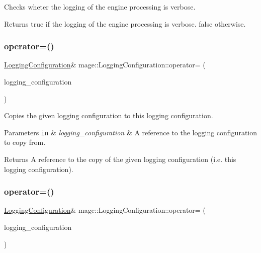 Checks wheter the logging of the engine processing is verbose.

\begin{DoxyReturn}{Returns}
{\ttfamily true} if the logging of the engine processing is verbose. {\ttfamily false} otherwise. 
\end{DoxyReturn}
\hypertarget{structmage_1_1_logging_configuration_af35d0b0a2f5743944d3d9d66580074db}{}\label{structmage_1_1_logging_configuration_af35d0b0a2f5743944d3d9d66580074db} 
\subsubsection{\texorpdfstring{operator=()}{operator=()}\hspace{0.1cm}{\footnotesize\ttfamily [1/2]}}
{\footnotesize\ttfamily \hyperlink{structmage_1_1_logging_configuration}{Logging\+Configuration}\& mage\+::\+Logging\+Configuration\+::operator= (\begin{DoxyParamCaption}\item[{const \hyperlink{structmage_1_1_logging_configuration}{Logging\+Configuration} \&}]{logging\+\_\+configuration }\end{DoxyParamCaption})\hspace{0.3cm}{\ttfamily [default]}}

Copies the given logging configuration to this logging configuration.


\begin{DoxyParams}[1]{Parameters}
\mbox{\tt in}  & {\em logging\+\_\+configuration} & A reference to the logging configuration to copy from. \\
\hline
\end{DoxyParams}
\begin{DoxyReturn}{Returns}
A reference to the copy of the given logging configuration (i.\+e. this logging configuration). 
\end{DoxyReturn}
\hypertarget{structmage_1_1_logging_configuration_a699285ff50d1bb7573cc0c28bcf476b1}{}\label{structmage_1_1_logging_configuration_a699285ff50d1bb7573cc0c28bcf476b1} 
\subsubsection{\texorpdfstring{operator=()}{operator=()}\hspace{0.1cm}{\footnotesize\ttfamily [2/2]}}
{\footnotesize\ttfamily \hyperlink{structmage_1_1_logging_configuration}{Logging\+Configuration}\& mage\+::\+Logging\+Configuration\+::operator= (\begin{DoxyParamCaption}\item[{\hyperlink{structmage_1_1_logging_configuration}{Logging\+Configuration} \&\&}]{logging\+\_\+configuration }\end{DoxyParamCaption})\hspace{0.3cm}{\ttfamily [default]}}

